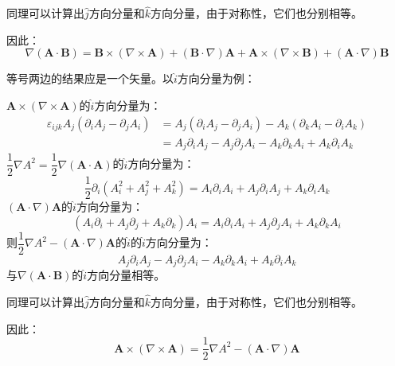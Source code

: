 \documentclass[a4paper,fontset=none]{ctexart}
\begin{document}
\begin{itemize}
        同理可以计算出$\hat{j}$方向分量和$\hat{k}$方向分量，由于对称性，它们也分别相等。

        因此：
        \[
            \nabla(\bm{A}\cdot\bm{B}) = \bm{B}\times(\nabla\times\bm{A}) + (\bm{B}\cdot\nabla)\bm{A} + \bm{A}\times(\nabla\times\bm{B}) + (\bm{A}\cdot\nabla)\bm{B}
        \]

        \textparagraph 等号两边的结果应是一个矢量。以$\hat{i}$方向分量为例：

        $\bm{A}\times(\nabla\times\bm{A})$的$\hat{i}$方向分量为：
        \begin{align*}
            \varepsilon_{ijk}A_j(\partial_i A_j - \partial_j A_i)
            &= A_j(\partial_i A_j - \partial_j A_i) - A_k(\partial_k A_i - \partial_i A_k) \\
            &= A_j\partial_i A_j - A_j\partial_j A_i - A_k\partial_k A_i + A_k\partial_i A_k
        \end{align*}
        $\dfrac{1}{2}\nabla A^2 = \dfrac{1}{2}\nabla(\bm{A}\cdot\bm{A})$的$\hat{i}$方向分量为：
        \[
            \frac{1}{2}\partial_i (A_i^2 + A_j^2 + A_k^2) = A_i \partial_i A_i + A_j \partial_i A_j + A_k \partial_i A_k
        \]
        $(\bm{A}\cdot\nabla)\bm{A}$的$\hat{i}$方向分量为：
        \[
            (A_i\partial_i + A_j\partial_j + A_k\partial_k)A_i = A_i\partial_i A_i + A_j\partial_j A_i + A_k\partial_k A_i
        \]
        则$\dfrac{1}{2}\nabla A^2 - (\bm{A}\cdot\nabla)\bm{A}$的$\hat{i}$的$\hat{i}$方向分量为：
        \[
            A_j\partial_i A_j - A_j\partial_j A_i - A_k\partial_k A_i + A_k\partial_i A_k
        \]
        与$\nabla(\bm{A}\cdot\bm{B})$的$\hat{i}$方向分量相等。

        同理可以计算出$\hat{j}$方向分量和$\hat{k}$方向分量，由于对称性，它们也分别相等。

        因此：
        \[
            \bm{A}\times(\nabla\times\bm{A}) = \frac{1}{2}\nabla A^2 - (\bm{A}\cdot\nabla)\bm{A}
        \]


\end{itemize}
\end{document}
